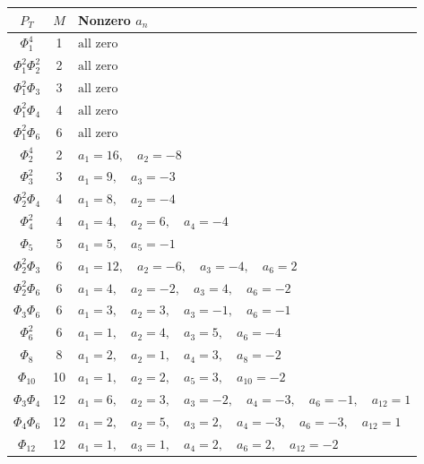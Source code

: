 \begin{center}
\small
\begin{tabular}{ccl}
$P_T$ & $M$ & Nonzero $a_n$\\\hline
$\Phi_{1}^{4}$ & 1 & $\text{all zero}$ \\
$\Phi_{1}^{2}\Phi_{2}^{2}$ & 2 & $\text{all zero}$ \\
$\Phi_{1}^{2}\Phi_{3}$ & 3 & $\text{all zero}$ \\
$\Phi_{1}^{2}\Phi_{4}$ & 4 & $\text{all zero}$ \\
$\Phi_{1}^{2}\Phi_{6}$ & 6 & $\text{all zero}$ \\
$\Phi_{2}^{4}$ & 2 & $a_{1}=16,\quad a_{2}=-8$ \\
$\Phi_{3}^{2}$ & 3 & $a_{1}=9,\quad a_{3}=-3$ \\
$\Phi_{2}^{2}\Phi_{4}$ & 4 & $a_{1}=8,\quad a_{2}=-4$ \\
$\Phi_{4}^{2}$ & 4 & $a_{1}=4,\quad a_{2}=6,\quad a_{4}=-4$ \\
$\Phi_{5}$ & 5 & $a_{1}=5,\quad a_{5}=-1$ \\
$\Phi_{2}^{2}\Phi_{3}$ & 6 & $a_{1}=12,\quad a_{2}=-6,\quad a_{3}=-4,\quad a_{6}=2$ \\
$\Phi_{2}^{2}\Phi_{6}$ & 6 & $a_{1}=4,\quad a_{2}=-2,\quad a_{3}=4,\quad a_{6}=-2$ \\
$\Phi_{3}\Phi_{6}$ & 6 & $a_{1}=3,\quad a_{2}=3,\quad a_{3}=-1,\quad a_{6}=-1$ \\
$\Phi_{6}^{2}$ & 6 & $a_{1}=1,\quad a_{2}=4,\quad a_{3}=5,\quad a_{6}=-4$ \\
$\Phi_{8}$ & 8 & $a_{1}=2,\quad a_{2}=1,\quad a_{4}=3,\quad a_{8}=-2$ \\
$\Phi_{10}$ & 10 & $a_{1}=1,\quad a_{2}=2,\quad a_{5}=3,\quad a_{10}=-2$ \\
$\Phi_{3}\Phi_{4}$ & 12 & $a_{1}=6,\quad a_{2}=3,\quad a_{3}=-2,\quad a_{4}=-3,\quad a_{6}=-1,\quad a_{12}=1$ \\
$\Phi_{4}\Phi_{6}$ & 12 & $a_{1}=2,\quad a_{2}=5,\quad a_{3}=2,\quad a_{4}=-3,\quad a_{6}=-3,\quad a_{12}=1$ \\
$\Phi_{12}$ & 12 & $a_{1}=1,\quad a_{3}=1,\quad a_{4}=2,\quad a_{6}=2,\quad a_{12}=-2$ \\
\end{tabular}
\end{center}
